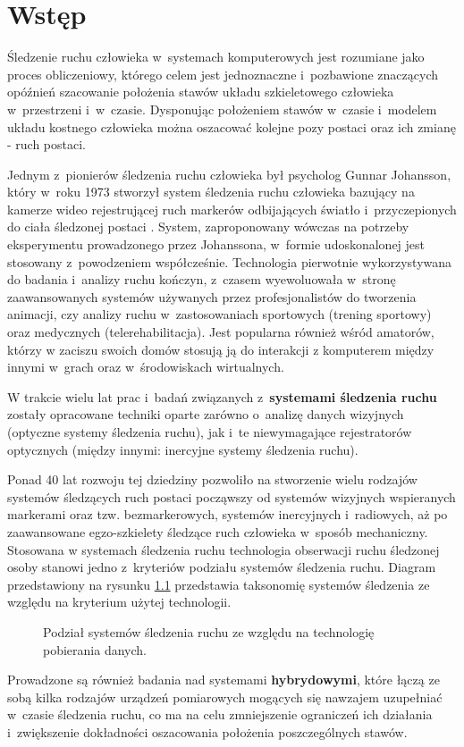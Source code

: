 
\chapter{Wstęp}\label{chap:intro}
Śledzenie ruchu człowieka w~systemach komputerowych jest rozumiane jako proces obliczeniowy, którego celem jest jednoznaczne i~pozbawione znaczących opóźnień szacowanie położenia stawów układu szkieletowego człowieka w~przestrzeni i~w~czasie. Dysponując położeniem stawów w~czasie i~modelem układu kostnego człowieka można oszacować kolejne pozy postaci oraz ich zmianę - ruch postaci.

Jednym z~pionierów śledzenia ruchu człowieka był psycholog Gunnar Johansson, który w~roku 1973 stworzył system śledzenia ruchu człowieka bazujący na kamerze wideo rejestrującej ruch markerów odbijających światło i~przyczepionych do ciała śledzonej postaci \cite{Johansson1973}. System, zaproponowany wówczas na potrzeby eksperymentu prowadzonego przez Johanssona, w~formie udoskonalonej jest stosowany z~powodzeniem współcześnie. Technologia pierwotnie wykorzystywana do badania i~analizy ruchu kończyn, z~czasem wyewoluowała w~stronę zaawansowanych systemów używanych przez profesjonalistów do tworzenia animacji, czy analizy ruchu w~zastosowaniach sportowych (trening sportowy) oraz medycznych (telerehabilitacja). Jest popularna również wśród amatorów, którzy w zaciszu swoich domów stosują ją do interakcji z komputerem między innymi w~grach oraz w~środowiskach wirtualnych.

W trakcie wielu lat prac i~badań związanych z~\textbf{systemami śledzenia ruchu} zostały opracowane techniki oparte zarówno o~analizę danych wizyjnych (optyczne systemy śledzenia ruchu), jak i~te niewymagające rejestratorów optycznych (między innymi: inercyjne systemy śledzenia ruchu).

Ponad 40 lat rozwoju tej dziedziny pozwoliło na stworzenie wielu rodzajów systemów śledzących ruch postaci począwszy od systemów wizyjnych wspieranych markerami oraz tzw. bezmarkerowych, systemów inercyjnych i~radiowych, aż po zaawansowane egzo-szkielety śledzące ruch człowieka w~sposób mechaniczny. Stosowana w systemach śledzenia ruchu technologia obserwacji ruchu śledzonej osoby stanowi jedno z~kryteriów podziału systemów śledzenia ruchu. Diagram przedstawiony na rysunku \ref{fig:literature:mocapSystems:diagram} przedstawia taksonomię systemów śledzenia ze względu na kryterium użytej technologii.

\begin{savenotes}
	\begin{figure}[!htb]
		\centering
		
		\caption{Podział systemów śledzenia ruchu ze względu na technologię pobierania danych.}
		\label{fig:literature:mocapSystems:diagram}
	\end{figure}
\end{savenotes}
Prowadzone są również badania nad systemami \textbf{hybrydowymi}, które łączą ze sobą kilka rodzajów urządzeń pomiarowych mogących się nawzajem uzupełniać w~czasie śledzenia ruchu, co ma na celu zmniejszenie ograniczeń ich działania i~zwiększenie dokładności oszacowania położenia poszczególnych stawów.

